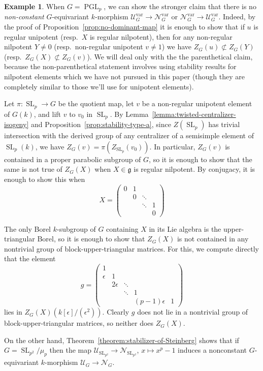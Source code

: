 \documentclass[11pt,reqno]{amsart}
\theoremstyle{definition}
\newtheorem{example}[theorem]{Example}
\renewcommand{\rm}{\mathrm}
\newcommand{\eps}{\epsilon}
\newcommand{\sN}{{\mathscr N}}
\newcommand{\sU}{{\mathscr U}}
\newcommand{\fg}{\mathfrak{g}}
\DeclareMathOperator{\PGL}{PGL}
\DeclareMathOperator{\SL}{SL}
\begin{document}
\begin{example}\label{example:pglp-nonconstant}
    When $G = \PGL_p$, we can show the stronger claim that there is no \textit{non-constant} $G$-equivariant $k$-morphism $\sU_G^{\rm{var}} \to \sN_G^{\rm{var}}$ or $\sN_G^{\rm{var}} \to \sU_G^{\rm{var}}$. Indeed, by the proof of Proposition~\ref{prop:no-dominant-map} it is enough to show that if $u$ is regular unipotent (resp.\ $X$ is regular nilpotent), then for any non-regular nilpotent $Y \neq 0$ (resp.\ non-regular unipotent $v \neq 1$) we have $Z_G(u) \not\subset Z_G(Y)$ (resp.\ $Z_G(X) \not\subset Z_G(v)$). We will deal only with the the parenthetical claim, because the non-parenthetical statement involves using stability results for nilpotent elements which we have not pursued in this paper (though they are completely similar to those we'll use for unipotent elements).

    Let $\pi\colon \SL_p \to G$ be the quotient map, let $v$ be a non-regular unipotent element of $G(k)$, and lift $v$ to $v_0$ in $\SL_p$. By Lemma~\ref{lemma:twisted-centralizer-isogeny} and Proposition~\ref{prop:stability-type-a}, since $Z(\SL_p)$ has trivial intersection with the derived group of any centralizer of a semisimple element of $\SL_p(k)$, we have $Z_G(v) = \pi(Z_{\SL_p}(v_0))$. In particular, $Z_G(v)$ is contained in a proper parabolic subgroup of $G$, so it is enough to show that the same is not true of $Z_G(X)$ when $X \in \fg$ is regular nilpotent. By conjugacy, it is enough to show this when 
    \[
    X = \begin{pmatrix}
        0 & 1 & &  \\
        &0 &\ddots &  \\
        & &\ddots  &1 \\
        & &  &0
    \end{pmatrix}
    \]
    
    The only Borel $k$-subgroup of $G$ containing $X$ in its Lie algebra is the upper-triangular Borel, so it is enough to show that $Z_G(X)$ is not contained in any nontrivial group of block-upper-triangular matrices. For this, we compute directly that the element
    \[
    g = \begin{pmatrix}
        1 & & & & \\
        \eps &1 & & & \\
        &2\eps &\ddots & & \\
        & &\ddots &1 & \\
        & & &(p-1)\eps &1
    \end{pmatrix}
    \]
    lies in $Z_G(X)(k[\eps]/(\eps^2))$. Clearly $g$ does not lie in a nontrivial group of block-upper-triangular matrices, so neither does $Z_G(X)$.

    On the other hand, Theorem~\ref{theorem:stabilizer-of-Steinberg} shows that if $G = \SL_{p^2}/\mu_p$ then the map $\sU_{\SL_{p^2}} \to \sN_{\SL_{p^2}}$, $x \mapsto x^p - 1$ induces a nonconstant $G$-equivariant $k$-morphism $\sU_G \to \sN_G$.
\end{example}
\end{document}
